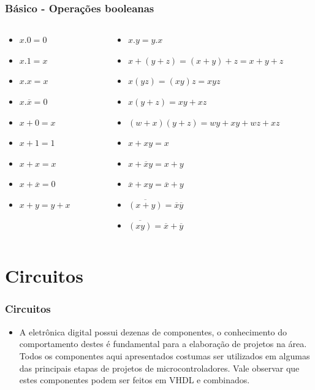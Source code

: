 \documentclass{beamer}
\begin{document}
\begin{frame}
  \frametitle{Básico - Operações booleanas}
\begin{columns}[c]
  \begin{column}{3cm}
   \begin{itemize}
   \item $x.0 = 0 $  \pause
   \item $x.1 = x $  \pause 
   \item $x.x = x $  \pause
   \item $x.\overline{x} = 0 $  \pause
   \item $x + 0 = x $  \pause
   \item $x + 1 = 1 $  \pause 
   \item $x + x = x $  \pause 
   \item $x + \overline{x} = 0 $  \pause 
   \item $x + y = y + x $  \pause 
  \end{itemize}
 \end{column} 
  
  \begin{column}{7cm}
   \begin{itemize}
   \item $x.y = y.x $  \pause
   \item $x + (y + z) = (x + y) + z = x + y + z $  \pause 
   \item $x(yz) = (xy)z = xyz $  \pause
   \item $x(y + z) = xy + xz $  \pause
   \item $(w + x)(y + z) = wy + xy + wz + xz$  \pause
   \item $x + xy = x $  \pause 
   \item $x + \overline{x}y = x + y $  \pause 
   \item $\overline{x} + xy = \overline{x} + y$  \pause 
   \item $\overline{(x + y)} = \overline{x}\overline{y} $  \pause 
   \item $\overline{(xy)} = \overline{x} + \overline{y} $   
  \end{itemize}
  \end{column}
\end{columns}
\end{frame}



  
\section{Circuitos}
\begin{frame}
  \frametitle{Circuitos}
  \begin{itemize}
   \item A eletrônica digital possui dezenas de componentes, o conhecimento do comportamento destes é fundamental para a elaboração de projetos na área. 
	 Todos os componentes aqui apresentados costumas ser utilizados em algumas das principais etapas de projetos de microcontroladores. Vale observar 
	 que estes componentes podem ser feitos em VHDL e combinados.
  \end{itemize}
\end{frame}
\end{document}
